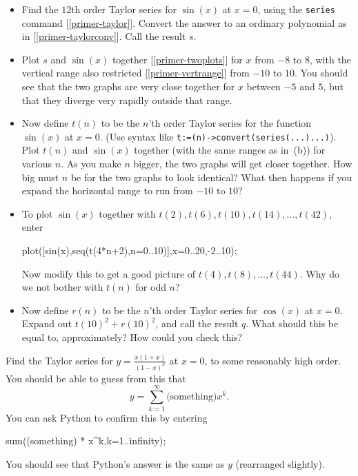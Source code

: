 \documentclass[a4paper,10pt]{amsbook}
\begin{document}
\begin{exercise}\label{ex-sin}
 \begin{itemize}
  \item[(a)] Find the $12$th order Taylor series for
   $\sin(x)$ at $x=0$, using the \verb~series~ command
   [\ref{primer-taylor}].  Convert the answer to an ordinary
   polynomial as in [\ref{primer-taylorconv}]. Call the result $s$. 
  \item[(b)] Plot $s$ and $\sin(x)$ together
   [\ref{primer-twoplots}] for $x$ from
   $-8$ to $8$, with the vertical range also restricted
   [\ref{primer-vertrange}]  from $-10$ to $10$.  You should see that
   the two graphs are very close together for $x$ between
   $-5$ and $5$, but that they diverge very rapidly outside
   that range. 
  \item[(c)] Now define $t(n)$ to be the $n$'th order Taylor
   series for the function $\sin(x)$ at $x=0$.  (Use syntax like 
   \verb~t:=(n)->convert(series(...)...)~).  Plot $t(n)$ and
   $\sin(x)$ together (with the same ranges as in~(b)) for
   various $n$.  As you make $n$ bigger, the two graphs will
   get closer together.  How big must $n$ be for the two
   graphs to look identical?  What then happens if you
   expand the horizontal range to run from $-10$ to $10$? 
  \item[(d)] To plot $\sin(x)$ together with
   $t(2),t(6),t(10),t(14),\ldots,t(42)$, enter
\begin{pcodeblock}
   plot([sin(x),seq(t(4*n+2),n=0..10)],x=0..20,-2..10);
\end{pcodeblock}
   Now modify this to get a good picture of
   $t(4),t(8),\ldots,t(44)$.  Why do we not bother with
   $t(n)$ for odd $n$? 
  \item[(e)] Now define $r(n)$ to be the $n$'th order Taylor
   series for $\cos(x)$ at $x=0$.  Expand out
   $t(10)^2+r(10)^2$, and call the result $q$.  What should
   this be equal to, approximately?  How could you check this? 
 \end{itemize}
\end{exercise}

\begin{exercise}\label{ex-rat}
 Find the Taylor series for $y=\frac{x(1+x)}{(1-x)^3}$ at
 $x=0$, to some reasonably high order.  You should be able
 to guess from this that
 \[ y = \sum_{k=1}^\infty \text{(something)} x^k. \]
 You can ask Python to confirm this by entering
\begin{pcodeblock}
  sum((something) * x^k,k=1..infinity);
\end{pcodeblock}
 You should see that Python's answer is the same as $y$
 (rearranged slightly). 
\end{exercise}
\end{document}
